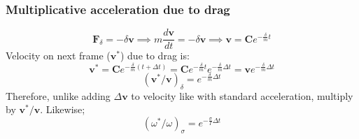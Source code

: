 \documentclass[10pt]{report}
\begin{document}
\subsubsection{Multiplicative acceleration due to drag}
\begin{equation}\boldsymbol{F}_\delta=-\delta\boldsymbol{v}\implies m\frac{d\boldsymbol{v}}{dt}=-\delta\boldsymbol{v}\implies\boldsymbol{v}=\boldsymbol{C}e^{-\frac{\delta}{m}t}\end{equation}
Velocity on next frame ($\boldsymbol{v}^*$) due to drag is:
\begin{equation}\boldsymbol{v}^*=\boldsymbol{C}e^{-\frac{\delta}{m}(t+\Delta t)}=\boldsymbol{C}e^{-\frac{\delta}{m}t}e^{-\frac{\delta}{m}\Delta t}=\boldsymbol{v}e^{-\frac{\delta}{m}\Delta t}\end{equation}
\begin{equation}(\boldsymbol{v}^*/\boldsymbol{v})_\delta=e^{-\frac{\delta}{m}\Delta t}\end{equation}
Therefore, unlike adding $\Delta\boldsymbol{v}$ to velocity like with standard acceleration, multiply by $\boldsymbol{v}^*/\boldsymbol{v}$. Likewise;
\begin{equation}(\omega^*/\omega)_\sigma=e^{-\frac{\sigma}{I}\Delta t}\end{equation}
\end{document}
